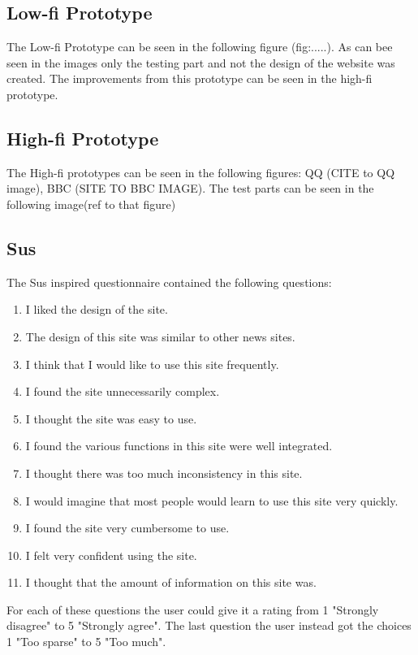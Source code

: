 \subsection{Low-fi Prototype}
The Low-fi Prototype can be seen in the following figure (fig:.....). As can bee seen in the images only the testing part and not the design of the website was created. The improvements from this prototype can be seen in the high-fi prototype.

\subsection{High-fi Prototype}
The High-fi prototypes can be seen in the following figures: QQ (CITE to QQ image), BBC (SITE TO BBC IMAGE). The test parts can be seen in the following image(ref to that figure)

\subsection{Sus}
The Sus inspired questionnaire contained the following questions:
\begin{enumerate}
	\item I liked the design of the site.
	\item The design of this site was similar to other news sites.
	\item I think that I would like to use this site frequently.
	\item I found the site unnecessarily complex.
	\item I thought the site was easy to use.
	\item I found the various functions in this site were well integrated.
	\item I thought there was too much inconsistency in this site.
	\item I would imagine that most people would learn to use this site very quickly.
	\item I found the site very cumbersome to use.
	\item I felt very confident using the site.
	\item I thought that the amount of information on this site was.
\end{enumerate}
For each of these questions the user could give it a rating from 1 "Strongly disagree" to 5 "Strongly agree". The last question the user instead got the choices 1 "Too sparse" to 5 "Too much".

